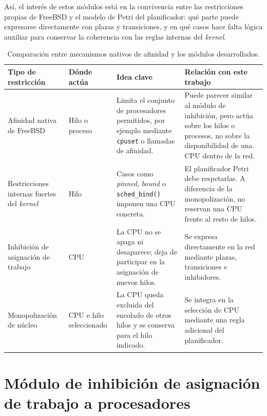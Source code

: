 Así, el interés de estos módulos está en la convivencia entre las restricciones propias de FreeBSD y el modelo de Petri del planificador: qué parte puede expresarse directamente con plazas y transiciones, y en qué casos hace falta lógica auxiliar para conservar la coherencia con las reglas internas del \textit{kernel}.\par

\begin{table}[H]
    \centering
    \footnotesize
    \setlength{\tabcolsep}{3pt}
    \begin{tabular}{|>{\RaggedRight\arraybackslash}p{}|>{\RaggedRight\arraybackslash}p{}|>{\RaggedRight\arraybackslash}p{}|>{\RaggedRight\arraybackslash}p{}|}
        \hline
        \textbf{Tipo de restricción} & \textbf{Dónde actúa} & \textbf{Idea clave} & \textbf{Relación con este trabajo} \\
        \hline
        Afinidad nativa de FreeBSD & Hilo o proceso & Limita el conjunto de procesadores permitidos, por ejemplo mediante \verb|cpuset| o llamadas de afinidad. & Puede parecer similar al módulo de inhibición, pero actúa sobre los hilos o procesos, no sobre la disponibilidad de una CPU dentro de la red. \\
        \hline
        Restricciones internas fuertes del \textit{kernel} & Hilo & Casos como \textit{pinned}, \textit{bound} o \verb|sched_bind()| imponen una CPU concreta. & El planificador Petri debe respetarlas. A diferencia de la monopolización, no reservan una CPU frente al resto de hilos. \\
        \hline
        Inhibición de asignación de trabajo & CPU & La CPU no se apaga ni desaparece; deja de participar en la asignación de nuevos hilos. & Se expresa directamente en la red mediante plazas, transiciones e inhibidores. \\
        \hline
        Monopolización de núcleo & CPU e hilo seleccionado & La CPU queda excluida del encolado de otros hilos y se conserva para el hilo indicado. & Se integra en la selección de CPU mediante una regla adicional del planificador. \\
        \hline
    \end{tabular}
    \caption{Comparación entre mecanismos nativos de afinidad y los módulos desarrollados.}
    \label{tabla:afinidad-freebsd-modulos}
\end{table}

\section{Módulo de inhibición de asignación de trabajo a procesadores}

